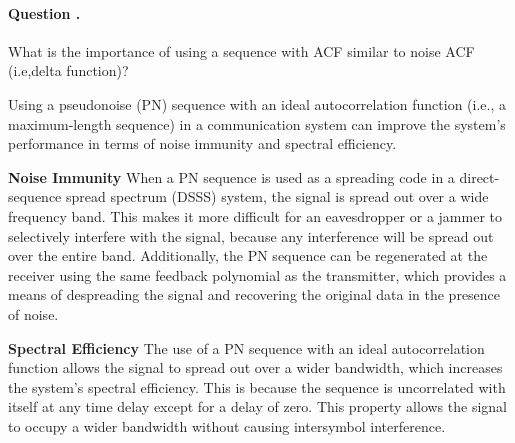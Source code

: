 \documentclass[14pt,a4paper]{report}
\newcounter{question}
\newcommand*\question{%
\stepcounter{question}%
\paragraph{Question \thesection.\thequestion}}
\begin{document}
\question
{
    What is the importance of using a sequence with ACF similar to noise ACF (i.e,delta function)?
}
\begin{answer_box*}
Using a pseudonoise (PN) sequence with an ideal autocorrelation function (i.e., a maximum-length sequence) in a communication system can improve the system's performance in terms of noise immunity and spectral efficiency.

\textbf{Noise Immunity}
When a PN sequence is used as a spreading code in a direct-sequence spread spectrum (DSSS) system, the signal is spread out over a wide frequency band. This makes it more difficult for an eavesdropper or a jammer to selectively interfere with the signal, because any interference will be spread out over the entire band. Additionally, the PN sequence can be regenerated at the receiver using the same feedback polynomial as the transmitter, which provides a means of despreading the signal and recovering the original data in the presence of noise.

\textbf{Spectral Efficiency}
The use of a PN sequence with an ideal autocorrelation function allows the signal to spread out over a wider bandwidth, which increases the system's spectral efficiency. This is because the sequence is uncorrelated with itself at any time delay except for a delay of zero. This property allows the signal to occupy a wider bandwidth without causing intersymbol interference.
\end{answer_box*}
\end{document}

